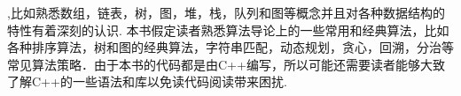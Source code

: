 
\begin{flushleft}
,比如熟悉数组，链表，树，图，堆，栈，队列和图等概念并且对各种数据结构的特性有着深刻的认识. 本书假定读者熟悉算法导论上的一些常用和经典算法，比如各种排序算法，树和图的经典算法，字符串匹配，动态规划，贪心，回溯，分治等常见算法策略．由于本书的代码都是由C++编写，所以可能还需要读者能够大致了解C++的一些语法和库以免读代码阅读带来困扰.
\end{flushleft}
